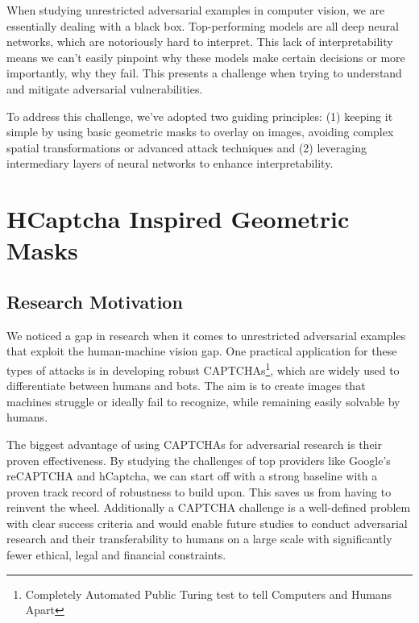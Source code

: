 \documentclass[a4paper, oneside]{discothesis}
\begin{document}
When studying unrestricted adversarial examples in computer vision, we are essentially dealing with a black box. Top-performing models are all deep neural networks, which are notoriously hard to interpret. This lack of interpretability means we can't easily pinpoint why these models make certain decisions or more importantly, why they fail. This presents a challenge when trying to understand and mitigate adversarial vulnerabilities.

To address this challenge, we've adopted two guiding principles: (1) keeping it simple by using basic geometric masks to overlay on images, avoiding complex spatial transformations or advanced attack techniques and (2) leveraging intermediary layers of neural networks to enhance interpretability.

% 
% 

\section{HCaptcha Inspired Geometric Masks}

\subsection{Research Motivation}

We noticed a gap in research when it comes to unrestricted adversarial examples that exploit the human-machine vision gap. One practical application for these types of attacks is in developing robust CAPTCHAs\footnote{Completely Automated Public Turing test to tell Computers and Humans Apart}, which are widely used to differentiate between humans and bots. The aim is to create images that machines struggle or ideally fail to recognize, while remaining easily solvable by humans.

The biggest advantage of using CAPTCHAs for adversarial research is their proven effectiveness. By studying the challenges of top providers like Google's reCAPTCHA and hCaptcha, we can start off with a strong baseline \textendash{} with a proven track record of robustness \textendash{} to build upon. This saves us from having to reinvent the wheel. Additionally a CAPTCHA challenge is a well-defined problem with clear success criteria and would enable future studies to conduct adversarial research and their transferability to humans on a large scale with significantly fewer ethical, legal and financial constraints.
\end{document}
